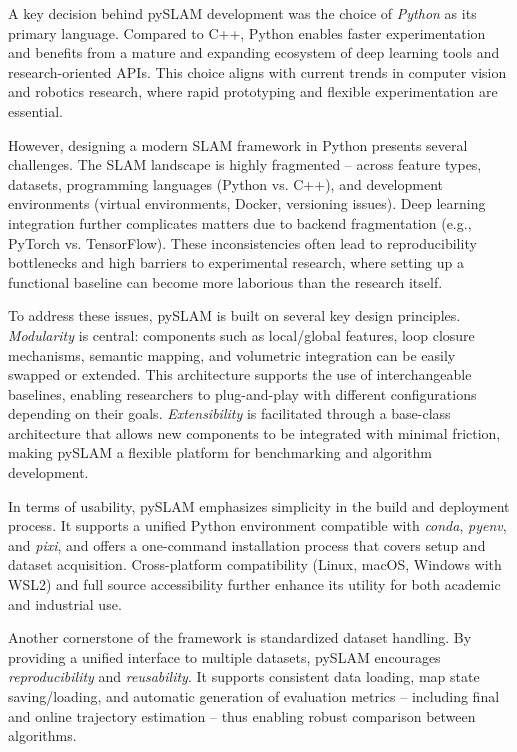 \documentclass{article}
\begin{document}
A key decision behind pySLAM development was the choice of \textit{Python} as its primary language. Compared to C++, Python enables faster experimentation and benefits from a mature and expanding ecosystem of deep learning tools and research-oriented APIs. This choice aligns with current trends in computer vision and robotics research, where rapid prototyping and flexible experimentation are essential.

However, designing a modern SLAM framework in Python presents several challenges. The SLAM landscape is highly fragmented -- across feature types, datasets, programming languages (Python vs. C++), and development environments (virtual environments, Docker, versioning issues). Deep learning integration further complicates matters due to backend fragmentation (e.g., PyTorch vs. TensorFlow). These inconsistencies often lead to reproducibility bottlenecks and high barriers to experimental research, where setting up a functional baseline can become more laborious than the research itself.

To address these issues, pySLAM is built on several key design principles. \textit{Modularity} is central: components such as local/global features\cite{tuytelaars2008local,joshi2020recent,ma2021image}, loop closure mechanisms\cite{schubert2023visual}, semantic mapping\cite{georgevichsemantic,chen2025semantic,schmid2024khronos}, and volumetric integration\cite{dong2022ash,freda2023plvs} can be easily swapped or extended. This architecture supports the use of interchangeable baselines, enabling researchers to plug-and-play with different configurations depending on their goals. \textit{Extensibility} is facilitated through a base-class architecture that allows new components to be integrated with minimal friction, making pySLAM a flexible platform for benchmarking and algorithm development.

In terms of usability, pySLAM emphasizes simplicity in the build and deployment process. It supports a unified Python environment compatible with \textit{conda}, \textit{pyenv}, and \textit{pixi}, and offers a one-command installation process that covers setup and dataset acquisition. Cross-platform compatibility (Linux, macOS, Windows with WSL2) and full source accessibility further enhance its utility for both academic and industrial use.

Another cornerstone of the framework is standardized dataset handling. By providing a unified interface to multiple datasets, pySLAM encourages \textit{reproducibility} and \textit{reusability}. It supports consistent data loading, map state saving/loading, and automatic generation of evaluation metrics -- including final and online trajectory estimation -- thus enabling robust comparison between algorithms.
\end{document}
